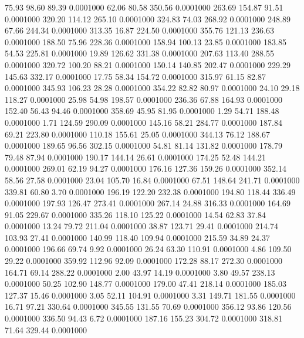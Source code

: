   75.93   98.60   89.39   0.0001000
  62.06   80.58  350.56   0.0001000
 263.69  154.87   91.51   0.0001000
 320.20  114.12  265.10   0.0001000
 324.83   74.03  268.92   0.0001000
 248.89   67.66  244.34   0.0001000
 313.35   16.87  224.50   0.0001000
 355.76  121.13  236.63   0.0001000
 188.50   75.96  228.36   0.0001000
 158.94  100.13   23.85   0.0001000
 183.85   54.53  225.81   0.0001000
  19.89  126.62  331.38   0.0001000
 207.63  113.40  288.55   0.0001000
 320.72  100.20   88.21   0.0001000
 150.14  140.85  202.47   0.0001000
 229.29  145.63  332.17   0.0001000
  17.75   58.34  154.72   0.0001000
 315.97   61.15   82.87   0.0001000
 345.93  106.23   28.28   0.0001000
 354.22   82.82   80.97   0.0001000
  24.10   29.18  118.27   0.0001000
  25.98   54.98  198.57   0.0001000
 236.36   67.88  164.93   0.0001000
 152.40   56.43   94.46   0.0001000
 358.69   45.95   81.95   0.0001000
   1.29   54.71  188.48   0.0001000
   1.71  124.59  290.09   0.0001000
 145.16   58.21  284.77   0.0001000
 187.84   69.21  223.80   0.0001000
 110.18  155.61   25.05   0.0001000
 344.13   76.12  188.67   0.0001000
 189.65   96.56  302.15   0.0001000
  54.81   81.14  131.82   0.0001000
 178.79   79.48   87.94   0.0001000
 190.17  144.14   26.61   0.0001000
 174.25   52.48  144.21   0.0001000
 269.01   62.19   94.27   0.0001000
 176.16  127.36  159.26   0.0001000
 352.14   58.56   27.58   0.0001000
  23.04  105.70   16.84   0.0001000
  67.51  148.64  241.71   0.0001000
 339.81   60.80    3.70   0.0001000
 196.19  122.20  232.38   0.0001000
 194.80  118.44  336.49   0.0001000
 197.93  126.47  273.41   0.0001000
 267.14   24.88  316.33   0.0001000
 164.69   91.05  229.67   0.0001000
 335.26  118.10  125.22   0.0001000
  14.54   62.83   37.84   0.0001000
  13.24   79.72  211.04   0.0001000
  38.87  123.71   29.41   0.0001000
 214.74  103.93   27.41   0.0001000
 140.99  118.40  109.94   0.0001000
 215.59   34.89   24.37   0.0001000
 196.66   69.74    9.92   0.0001000
  26.24   63.30  110.91   0.0001000
   4.86  109.50   29.22   0.0001000
 359.92  112.96   92.09   0.0001000
 172.28   88.17  272.30   0.0001000
 164.71   69.14  288.22   0.0001000
   2.00   43.97   14.19   0.0001000
   3.80   49.57  238.13   0.0001000
  50.25  102.90  148.77   0.0001000
 179.00   47.41  218.14   0.0001000
 185.03  127.37   15.46   0.0001000
   3.05   52.11  104.91   0.0001000
   3.31  149.71  181.55   0.0001000
  16.71   97.21  330.64   0.0001000
 345.55  131.55   70.69   0.0001000
 356.12   93.86  120.56   0.0001000
 336.50   94.43    6.72   0.0001000
 187.16  155.23  304.72   0.0001000
 318.81   71.64  329.44   0.0001000
